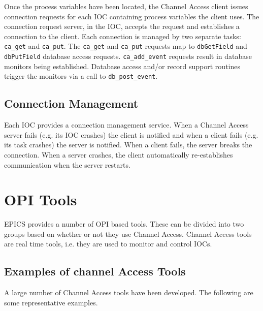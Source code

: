 Once the process variables have been located, the Channel Access client issues connection requests for each IOC 
containing process variables the client uses. The connection request server, in the IOC, accepts the request and establishes 
a connection to the client. Each connection is managed by two separate tasks: \verb|ca_get| and \verb|ca_put|. The \verb|ca_get| and 
\verb|ca_put| requests map to \verb|dbGetField| and \verb|dbPutField| database access requests. \verb|ca_add_event| requests result in 
database monitors being established. Database access and/or record support routines trigger the monitors via a call to 
\verb|db_post_event|.

\subsection{Connection Management}

Each IOC  provides a connection management service. When a Channel Access server fails (e.g. its IOC crashes) the 
client is notified and when a client fails (e.g. its task crashes) the server is notified. When a client fails, the server breaks 
the connection. When a server crashes, the client automatically re-establishes communication when the server restarts. 

\section{OPI Tools}

EPICS provides a number of OPI based tools. These can be divided into two groups based on whether or not they use 
Channel Access. Channel Access tools are real time tools, i.e. they are used to monitor and control IOCs.

\subsection{Examples of channel Access Tools}

A large number of Channel Access tools have been developed. The following are some representative examples.

